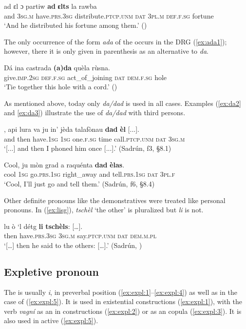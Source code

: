 \ea\label{ex:addat3}
\gll ad ɛl ɔ partiw \textbf{ad} \textbf{ɛlts} la rawba\\
     and \textsc{3sg.m} have.\textsc{prs.3sg} distribute.\textsc{ptcp.unm} \textsc{dat} \textsc{3pl.m} \textsc{def.f.sg} fortune\\
\glt `And he distributed his fortune among them.' (\citealt[86]{Gartner1910})
\z

The only occurrence of the form \textit{ada} of the  occurs in the DRG (\ref{ex:ada1}); however, there it is only given in parenthesis as an alternative to \textit{da}.

\ea\label{ex:ada1}
\gll  Dá ina castrada \textbf{(a)da} quèla rùsna.\\
     give.\textsc{imp.2sg} \textsc{def.f.sg} act\_of\_joining \textsc{dat} \textsc{dem.f.sg} hole\\
\glt `Tie together this hole with a cord.' ()
\z

As mentioned above, today only \textit{da/dad} is used in all cases. Examples (\ref{ex:da2} and \ref{ex:da3}) illustrate the use of \textit{da/dad} with third persons.

\ea
\label{ex:da2}
\gll  [...], api lura va ju in’ jèda talafònau \textbf{dad} \textbf{èl} [...].\\
{} and then have.\textsc{1sg}  \textsc{1sg} one.\textsc{f.sg} time call.\textsc{ptcp.unm} \textsc{dat} \textsc{3sg.m}\\
\glt `[...] and then I phoned him once [...].' (Sadrún, f3, §8.1)
\z

\ea
\label{ex:da3}
\gll  Cool, ju mòn grad a raquénta \textbf{dad} \textbf{èlas}.\\
cool \textsc{1sg}  go.\textsc{prs.1sg} right\_away and tell.\textsc{prs.1sg} \textsc{dat} \textsc{3pl.f} \\
\glt `Cool, I’ll just go and tell them.' (Sadrún, f6, §8.4)
\z

Other definite pronouns like the demonstratives were treated like personal pronouns. In (\ref{ex:lisg}), \textit{tschèl} `the other' is pluralized but \textit{li} is not.

\ea\label{ex:lisg}
\gll  […] lu ò ‘l détg \textbf{li} \textbf{tschèls}: […].\\
{} then have.\textsc{prs.3sg} \textsc{3sg.m} say.\textsc{ptcp.unm} \textsc{dat} \textsc{dem.m.pl}\\
\glt `[…] then he said to the others: […].' (Sadrún, \citealt[104]{Büchli1966})
\z


\subsection{Expletive pronoun}\label{sec:3.6.2}
 The  is usually \textit{i}, in preverbal position (\ref{ex:expl:1}--\ref{ex:expl:4}) as well as in the case of  (\ref{ex:expl:5}). It is used in existential constructions (\ref{ex:expl:1}), with the verb \isi\textit{vagní} as an  in  constructions (\ref{ex:expl:2}) or as an  copula (\ref{ex:expl:3}). It is also used in active  (\ref{ex:expl:5}).
 
